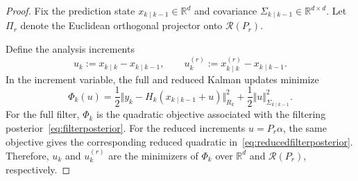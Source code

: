 \documentclass[a4paper,12pt]{article}
\begin{document}
\begin{proof}
Fix the prediction state $x_{k \mid k-1} \in \mathbb{R}^d$ and covariance $\Sigma_{k \mid k-1}  \in \mathbb{R}^{d \times d}$.
Let $\Pi_r$ denote the Euclidean orthogonal projector onto $\mathcal{R}(P_r)$.

Define the analysis increments
\begin{equation}
    u_k := x_{k \mid k} - x_{k \mid k-1}, \qquad
    u_k^{(r)} := x_{k \mid k}^{(r)} - x_{k \mid k-1}.
\end{equation}
In the increment variable, the full and reduced Kalman updates minimize
\begin{equation}
    \Phi_k(u)
    = \frac{1}{2} \Vert y_k - H_k(x_{k \mid k-1} + u) \Vert_{R_{k}}^{2}
    + \frac{1}{2} \Vert u \Vert_{\Sigma_{k \mid k-1}}^{2}.
\end{equation}
For the full filter, $\Phi_k$ is the quadratic objective associated with
the filtering posterior~\eqref{eq:filterposterior}.
For the reduced increments $u = P_r \alpha$, the same objective gives the corresponding
reduced quadratic in~\eqref{eq:reducedfilterposterior}.
Therefore, $u_k$ and $u_{k}^{(r)}$ are the minimizers of $\Phi_k$ over
$\mathbb{R}^d$ and $\mathcal{R}(P_r)$, respectively.


\end{proof}
\end{document}
